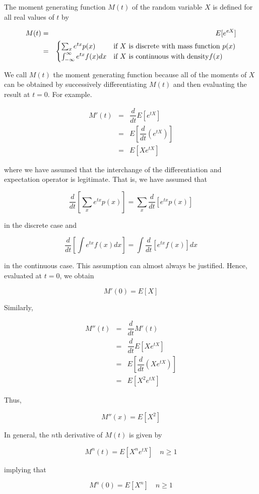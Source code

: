 \begin{defn}
	The moment generating function $M(t)$ of the random variable $X$ is defined for all real values of $t$ by
	
	\begin{eqnarray*}
		M(t) &=& E[e^{eX}] \\
		&=& \begin{cases}
			\sum_x e^{tx}p(x) & $if $ X $ is discrete with mass function $ p(x)\\
			\int^{\infty}_{-\infty}e^{tx}f(x)dx & $if $ X $ is continuous with density$ f(x)
		\end{cases}
 	\end{eqnarray*}
 	
 	We call $M(t)$ the moment generating function because all of the moments of $X$ can be obtained by successively differentiating $M(t)$ and then evaluating the result at $t = 0$. For example.
 	
 	\begin{eqnarray*}
 		M'(t) &=& \dfrac{d}{dt}E[e^{tX}] \\
 		&=& E\left[\dfrac{d}{dt}(e^{tX})\right]\\
 		&=& E[Xe^{tX}]
 	\end{eqnarray*}
 	
 	where we have assumed that the interchange of the differentiation and expectation operator is legitimate. That is, we have assumed that
 	
 	$$\dfrac{d}{dt}\left[ \sum_xe^{tx}p(x) \right] = \sum_x \dfrac{d}{dt}[e^{tx}p(x)]$$
 	
 	in the discrete case and
 	
 	$$\dfrac{d}{dt}\left[ \int e^{tx}f(x)dx \right] = \int \dfrac{d}{dt}[e^{tx}f(x)]dx$$
 	
 	in the continuous case. This assumption can almost always be justified. Hence, evaluated at $t = 0$, we obtain
 	
 	$$M'(0) = E[X]$$
 	
 	Similarly,
 	
 	\begin{eqnarray*}
 		M''(t) &=& \dfrac{d}{dt}M'(t) \\
 		&=& \dfrac{d}{dt}E[Xe^{tX}] \\
 		&=& E\left[ \dfrac{d}{dt}(Xe^{tX}) \right] \\
 		&=& E[X^2 e^{tX}]
 	\end{eqnarray*}
 	
 	Thus,
 	
 	$$M''(x) = E[X^2]$$
 	
 	In general, the $n$th derivative of $M(t)$ is given by
 	
 	$$M^n(t) = E[X^ne^{tX}] \quad n \geq 1$$
 	
 	implying that
 	
 	$$M^n(0) = E[X^n] \quad n \geq 1$$
\end{defn}

